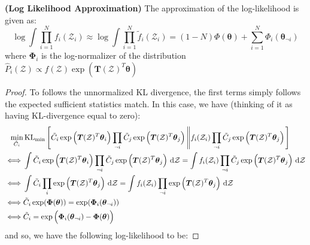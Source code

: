 \begin{proposition}{\textbf{(Log Likelihood Approximation)}}
    The approximation of the log-likelihood is given as:
    \begin{equation*}
        \log \int \prod^N_{i=1}f_i(\mathcal{Z}_i) \approx \log \int \prod^N_{i=1}\tilde{f}_i(\mathcal{Z}_i) = (1- N)\Phi(\boldsymbol \theta) + \sum_{i=1}^N \Phi_i(\boldsymbol \theta_{\neg i})
    \end{equation*}
    where $\boldsymbol \Phi_i$ is the log-normalizer of the distribution $\hat{P}_i(\mathcal{Z}) \propto f(\mathcal{Z})\exp(\boldsymbol T(\mathcal{Z})^T\boldsymbol \theta)$
\end{proposition}
\begin{proof}
    To follows the unnormalized KL divergence, the first terms simply follows the expected sufficient statistics match. In this case, we have (thinking of it as having KL-divergence equal to zero):
    \begin{equation*}
    \begin{aligned}
        \min_{\tilde{C}_i}&\operatorname{KL}_\text{min}\left[  \tilde{C}_i\exp\Big( \boldsymbol T(\mathcal{Z})^T\boldsymbol \theta_i \Big) \prod_{\neg i} \tilde{C}_j\exp\Big( \boldsymbol T(\mathcal{Z})^T\boldsymbol \theta_j \Big) \left\| f_i(\mathcal{Z}_i)\prod_{\neg i} \tilde{C}_j\exp\Big( \boldsymbol T(\mathcal{Z})^T\boldsymbol \theta_j \Big) \right. \right] \\
        \iff& \int \tilde{C}_i\exp\Big( \boldsymbol T(\mathcal{Z})^T\boldsymbol \theta_i \Big) \prod_{\neg i} \tilde{C}_j\exp\Big( \boldsymbol T(\mathcal{Z})^T\boldsymbol \theta_j \Big) \ \mathrm{d} \mathcal{Z} = \int f_i(\mathcal{Z}_i)\prod_{\neg i} \tilde{C}_j\exp\Big( \boldsymbol T(\mathcal{Z})^T\boldsymbol \theta_j \Big) \ \mathrm{d} \mathcal{Z} \\
        \iff& \int \tilde{C}_i \prod_{i}\exp\Big( \boldsymbol T(\mathcal{Z})^T\boldsymbol \theta_j \Big) \ \mathrm{d} \mathcal{Z} = \int f_i(\mathcal{Z}_i)\prod_{\neg i} \exp\Big( \boldsymbol T(\mathcal{Z})^T\boldsymbol \theta_j \Big) \ \mathrm{d} \mathcal{Z} \\
        \iff& \tilde{C}_i \exp(\boldsymbol \Phi(\boldsymbol \theta)) = \exp(\boldsymbol \Phi_i(\boldsymbol \theta_{\neg i})) \\
        \iff& \tilde{C}_i = \exp\Big(\boldsymbol \Phi_i(\boldsymbol \theta_{\neg i}) - \boldsymbol \Phi(\boldsymbol \theta) \Big)
    \end{aligned}
    \end{equation*}
    and so, we have the following log-likelihood to be:

\end{proof}

